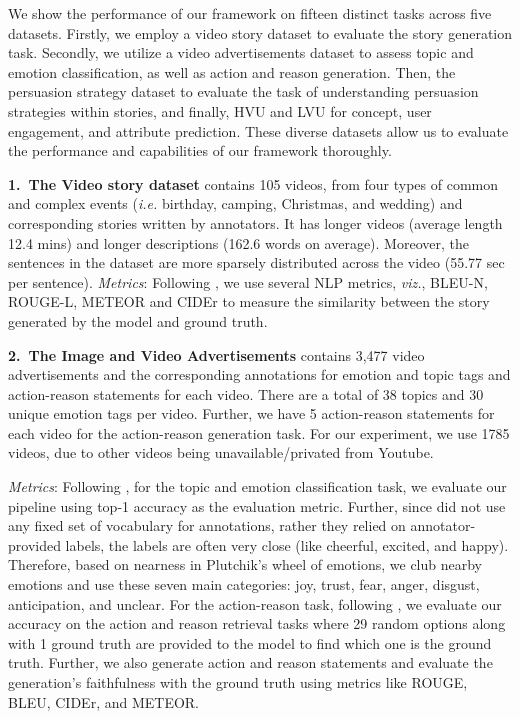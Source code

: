 We show the performance of our framework on fifteen distinct tasks across five datasets. Firstly, we employ a video story dataset to evaluate the story generation task. Secondly, we utilize a video advertisements dataset to assess topic and emotion classification, as well as action and reason generation. Then, the persuasion strategy dataset to evaluate the task of understanding persuasion strategies within stories, and finally, HVU and LVU for concept, user engagement, and attribute prediction. These diverse datasets allow us to evaluate the performance and capabilities of our framework thoroughly.


\textbf{1.~The Video story dataset} \cite{Li_2020} contains 105 videos, from four types of common and complex events (\textit{i.e.} birthday, camping, Christmas, and wedding) and corresponding stories written by annotators. It has longer videos (average length 12.4 mins) and longer descriptions (162.6 words on average).
Moreover, the sentences in the dataset are more sparsely distributed across the video (55.77 sec per sentence).
\textit{Metrics}: Following \cite{Li_2020}, we use several NLP metrics, \textit{viz.}, BLEU-N, ROUGE-L, METEOR and CIDEr to measure the similarity between the story generated by the model and ground truth.


\textbf{2.~The Image and Video Advertisements} \cite{hussain2017automatic} contains 3,477 video advertisements and the corresponding annotations for emotion and topic tags and action-reason statements for each video. There are a total of 38 topics and 30 unique emotion tags per video. Further, we have 5 action-reason statements for each video for the action-reason generation task. For our experiment, we use 1785 videos, due to other videos being unavailable/privated from Youtube.

\textit{Metrics}: Following \cite{hussain2017automatic}, for the topic and emotion classification task, we evaluate our pipeline using top-1 accuracy as the evaluation metric. Further, since \cite{hussain2017automatic} did not use any fixed set of vocabulary for annotations, rather they relied on annotator-provided labels, the labels are often very close (like cheerful, excited, and happy). Therefore, based on nearness in Plutchik's \cite{PLUTCHIK19803} wheel of emotions, we club nearby emotions and use these seven main categories: joy, trust, fear, anger, disgust, anticipation, and unclear. For the action-reason task, following \cite{hussain2017automatic}, we evaluate our accuracy on the action and reason retrieval tasks where 29 random options along with 1 ground truth are provided to the model to find which one is the ground truth. Further, we also generate action and reason statements and evaluate the generation's faithfulness with the ground truth using metrics like ROUGE, BLEU, CIDEr, and METEOR.



